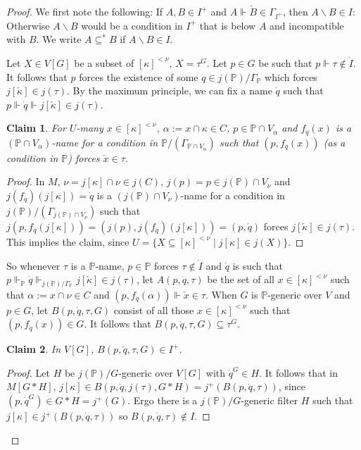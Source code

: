 \documentclass[a4paper]{amsart}
\theoremstyle{definition}
\theoremstyle{remark}
\theoremstyle{plain}
\newtheorem{myclaim}{Claim}
\numberwithin{mydef}{section}
\newcommand{\dP}{\mathbb{P}}
\begin{document}
\begin{proof}
		We first note the following: If $A,B\in I^+$ and $A\Vdash\check{B}\in\Gamma_{I^+}$, then $A\smallsetminus B\in I$: Otherwise $A\smallsetminus B$ would be a condition in $I^+$ that is below $A$ and incompatible with $B$. We write $A\subseteq^*B$ if $A\smallsetminus B\in I$.
		
		Let $X\in V[G]$ be a subset of $[\kappa]^{<\nu}$, $X=\tau^G$. Let $p\in G$ be such that $p\Vdash\tau\notin\dot{I}$. It follows that $p$ forces the existence of some $q\in j(\dP)/\Gamma_{\dP}$ which forces $j[\check{\kappa}]\in j(\tau)$. By the maximum principle, we can fix a name $\dot{q}$ such that $p\Vdash\dot{q}\Vdash j[\check{\kappa}]\in j(\tau)$.
		
		\begin{myclaim}
			For $U$-many $x\in[\kappa]^{<\nu}$, $\alpha:=x\cap\kappa\in C$, $p\in\dP\cap V_{\alpha}$ and $f_{\dot{q}}(x)$ is a $(\dP\cap V_{\alpha})$-name for a condition in $\dP/(\Gamma_{\dP\cap V_{\alpha}})$ such that $(p,f_{\dot{q}}(x))$ (as a condition in $\dP$) forces $\check{x}\in\tau$.
		\end{myclaim}
		
		\begin{proof}
			In $M$, $\nu=j[\kappa]\cap\nu\in j(C)$, $j(p)=p\in j(\dP)\cap V_{\nu}$ and $j(f_{\dot{q}})(j[\kappa])=\dot{q}$ is a $(j(\dP)\cap V_{\nu})$-name for a condition in $j(\dP)/(\Gamma_{j(\dP)\cap V_{\nu}})$ such that $j(p,f_{\dot{q}}(j[\kappa]))=(j(p),j(f_{\dot{q}})(j[\kappa]))=(p,\dot{q})$ forces $j[\check{\kappa}]\in j(\tau)$. This implies the claim, since $U=\{X\subseteq[\kappa]^{<\nu}\;|\;j[\kappa]\in j(X)\}$.
		\end{proof}
		
		So whenever $\tau$ is a $\dP$-name, $p\in\dP$ forces $\tau\notin\dot{I}$ and $\dot{q}$ is such that $p\Vdash_{\dP}\dot{q}\Vdash_{j(\dP)/\Gamma_{\dP}}j[\check{\kappa}]\in j(\tau)$, let $A(p,\dot{q},\tau)$ be the set of all $x\in[\kappa]^{<\nu}$ such that $\alpha:=x\cap\nu\in C$ and $(p,f_{\dot{q}}(\alpha))\Vdash\check{x}\in\tau$. When $G$ is $\dP$-generic over $V$ and $p\in G$, let $B(p,\dot{q},\tau,G)$ consist of all those $x\in[\kappa]^{<\nu}$ such that $(p,f_{\dot{q}}(x))\in G$. It follows that $B(p,\dot{q},\tau,G)\subseteq\tau^G$.
		
		\begin{myclaim}
			In $V[G]$, $B(p,\dot{q},\tau,G)\in I^+$.
		\end{myclaim}
		
		\begin{proof}
			Let $H$ be $j(\dP)/G$-generic over $V[G]$ with $\dot{q}^G\in H$. It follows that in $M[G*H]$, $j[\kappa]\in B(p,\dot{q},j(\tau),G*H)=j^+(B(p,\dot{q},\tau))$, since $(p,\dot{q}^G)\in G*H=j^+(G)$. Ergo there is a $j(\dP)/G$-generic filter $H$ such that $j[\kappa]\in j^+(B(p,\dot{q},\tau))$ so $B(p,\dot{q},\tau)\notin I$.
		\end{proof}
		

\end{proof}
\end{document}
